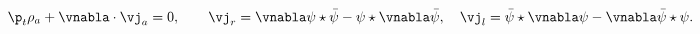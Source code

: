 \begin{equation}
\p_{t}\rho_{a}+\vnabla\cdot\vj_{a}=0,
\qquad
\vj_{r}=\vnabla\psi\star\bar{\psi}-
\psi\star\vnabla\bar{\psi},
\quad
\vj_{l}=
\bar{\psi}\star\vnabla\psi
-\vnabla\bar{\psi}\star\psi.
\label{current}
\end{equation}

